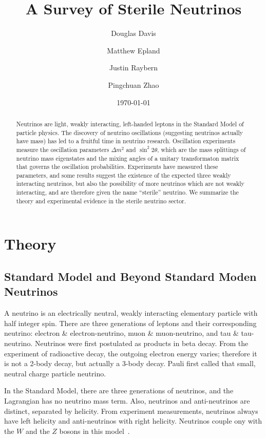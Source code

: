 \documentclass[aps,prd,twocolumn,nofootinbib]{revtex4-1}
\begin{document}
\title{A Survey of Sterile Neutrinos}
\author{Douglas Davis}
\author{Matthew Epland}
\author{Justin Raybern}
\author{Pingchuan Zhao}
\date{\today}
\begin{abstract}
Neutrinos are light, weakly interacting, left-handed leptons in the Standard Model of particle physics. The discovery of neutrino oscillations (suggesting neutrinos actually have mass) has led to a fruitful time in neutrino research. Oscillation experiments measure the oscillation parameters $\Delta m^2$ and $\sin^2 2\theta$, which are the mass splittings of neutrino mass eigenstates and the mixing angles of a unitary transformaton matrix that governs the oscillation probabilities. Experiments have measured these parameters, and some results suggest the existence of the expected three weakly interacting neutrinos, but also the possibility of more neutrinos which are not weakly interacting, and are therefore given the name ``sterile'' neutrino. We summarize the theory and experimental evidence in the sterile neutrino sector.
\end{abstract}\maketitle
\section{Theory}
\label{sec:theory}
\subsection{Standard Model and Beyond Standard Moden Neutrinos}
A neutrino is an electrically neutral, weakly interacting elementary particle with half integer spin. There are three generations of leptons and their corresponding neutrino: electron \& electron-neutrino, muon \& muon-neutrino, and tau \& tau-neutrino. Neutrinos were first postulated as products in beta decay. From the experiment of radioactive decay, the outgoing electron energy varies; therefore it is not a 2-body decay, but actually a 3-body decay. Pauli first called that small, neutral charge particle neutrino.

In the Standard Model, there are three generations of neutrinos, and the Lagrangian has no neutrino mass term. Also, neutrinos and anti-neutrinos are distinct, separated by helicity. From experiment measurements, neutrinos always have left helicity and anti-neutrinos with right helicity. Neutrinos couple ony with the $W$ and the $Z$ bosons in this model~\cite{ping1}.
\end{document}
